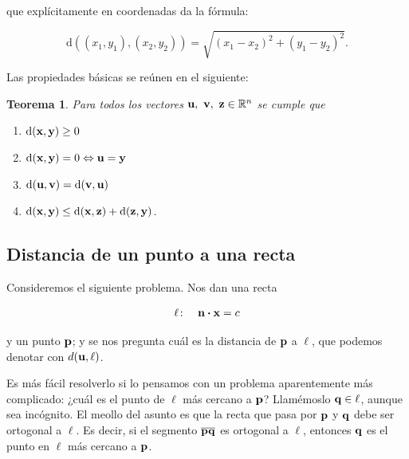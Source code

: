 \documentclass{article}
\theoremstyle{definicion}
\theoremstyle{definition}             %
\theoremstyle{definition}             %
\theoremstyle{definition}
\theoremstyle{definition}
\theoremstyle{observacion}
\theoremstyle{definition}
\theoremstyle{plain}
\newtheorem{theorem}{Teorema}
\theoremstyle{definition}
\theoremstyle{afirmacion}
\theoremstyle{notation}
\theoremstyle{definition}
\begin{document}
        que explícitamente en coordenadas da la fórmula:

        \begin{equation*}
            \textrm{d}((x_{1}, y_{1}), (x_{2}, y_{2})) = \sqrt{(x_{1} - x_{2})^2 + (y_{1} - y_{2})^2}.
        \end{equation*}

        Las propiedades básicas se reúnen en el siguiente:

        \begin{theorem}
            Para todos los vectores \(\vb{u},\ \vb{v},\ \vb{z} \in \mathbb{R}^{n}\) se cumple que

            \begin{enumerate}[label = \textnormal{\Roman*)}]
                \item \(\textrm{d}(\vb{x}, \vb{y}) \geq 0\)
                \item \(\textrm{d}(\vb{x}, \vb{y}) = 0 \Leftrightarrow \vb{u} = \vb{y}\)
                \item \(\textrm{d}(\vb{u}, \vb{v}) = \textrm{d}(\vb{v}, \vb{u})\)
                \item \(\textrm{d}(\vb{x}, \vb{y}) \leq \textrm{d}(\vb{x}, \vb{z}) + \textrm{d}(\vb{z}, \vb{y})\).
            \end{enumerate}
        \end{theorem}

        \subsection{Distancia de un punto a una recta}

        Consideremos el siguiente problema. Nos dan una recta

        \begin{equation*}
            \ell \colon\quad \vb{n} \vdot \vb{x} = c
        \end{equation*}

        y un punto \(\vb{p}\); y se nos pregunta cuál es la distancia de \(\vb{p}\) a \(\ell\), que podemos denotar con \(d(\vb{u}, \ell)\).

        Es más fácil resolverlo si lo pensamos con un problema aparentemente más complicado: ¿cuál es el punto de \(\ell\) más cercano a \(\vb{p}\)? Llamémoslo \(\vb{q} \in \ell\), aunque sea incógnito. El meollo del asunto es que la recta que pasa por \(\vb{p}\) y \(\vb{q}\) debe ser ortogonal a \(\ell\). Es decir, si el segmento \(\overline{\vb{p}\vb{q}}\) es ortogonal a \(\ell\), entonces \(\vb{q}\) es el punto en \(\ell\) más cercano a \(\vb{p}\).
\end{document}
